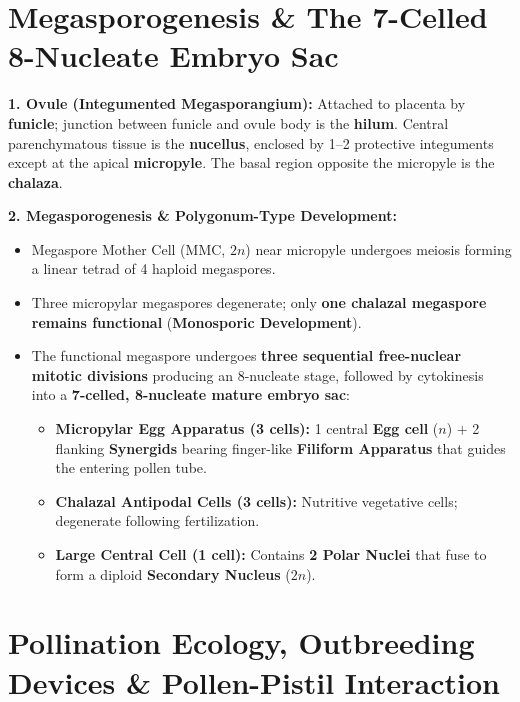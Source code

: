 \documentclass[10pt,twoside,openright]{book}
\begin{document}
\section{Megasporogenesis \& The 7-Celled 8-Nucleate Embryo Sac}

\begin{conceptbox}
\textbf{1. Ovule (Integumented Megasporangium):}
Attached to placenta by \textbf{funicle}; junction between funicle and ovule body is the \textbf{hilum}. Central parenchymatous tissue is the \textbf{nucellus}, enclosed by 1--2 protective integuments except at the apical \textbf{micropyle}. The basal region opposite the micropyle is the \textbf{chalaza}.

\textbf{2. Megasporogenesis \& Polygonum-Type Development:}
\begin{itemize}
  \item Megaspore Mother Cell (MMC, $2n$) near micropyle undergoes meiosis forming a linear tetrad of 4 haploid megaspores.
  \item Three micropylar megaspores degenerate; only \textbf{one chalazal megaspore remains functional} (\textbf{Monosporic Development}).
  \item The functional megaspore undergoes \textbf{three sequential free-nuclear mitotic divisions} producing an 8-nucleate stage, followed by cytokinesis into a \textbf{7-celled, 8-nucleate mature embryo sac}:
  \begin{itemize}
    \item \textbf{Micropylar Egg Apparatus (3 cells):} 1 central \textbf{Egg cell} ($n$) $+$ 2 flanking \textbf{Synergids} bearing finger-like \textbf{Filiform Apparatus} that guides the entering pollen tube.
    \item \textbf{Chalazal Antipodal Cells (3 cells):} Nutritive vegetative cells; degenerate following fertilization.
    \item \textbf{Large Central Cell (1 cell):} Contains \textbf{2 Polar Nuclei} that fuse to form a diploid \textbf{Secondary Nucleus} ($2n$).
  \end{itemize}
\end{itemize}
\end{conceptbox}

\section{Pollination Ecology, Outbreeding Devices \& Pollen-Pistil Interaction}
\end{document}
